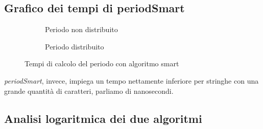 \documentclass[a4paper,titlepage]{article}
\begin{document}
\subsection{Grafico dei tempi di periodSmart}

\begin{figure}[h]
  \centering
  \begin{subfigure}{\textwidth}
    \captionsetup{justification=centering}
    \caption{Periodo non distribuito}
     \label{fig:smart}
  \end{subfigure}%
   \vspace{2pt}
  \begin{subfigure}{\textwidth}
    \captionsetup{justification=centering}
     \caption{Periodo distribuito}
     \label{fig:smart_dist}
  \end{subfigure}
  \caption{Tempi di calcolo del periodo con algoritmo smart}
\end{figure}

\textit{periodSmart}, invece, impiega un tempo nettamente inferiore per stringhe con una grande quantità di caratteri, parliamo di nanosecondi.
\newpage

\subsection{Analisi logaritmica dei due algoritmi}
\end{document}
